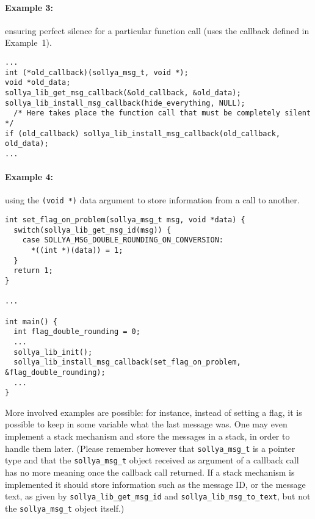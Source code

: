 \documentclass[a4paper]{article}
\begin{document}
\paragraph{Example 3:} ensuring perfect silence for a particular function call (uses the callback defined in Example~1).
\begin{center}
\begin{minipage}{15cm}\begin{Verbatim}[frame=single]
...
int (*old_callback)(sollya_msg_t, void *);
void *old_data;
sollya_lib_get_msg_callback(&old_callback, &old_data);
sollya_lib_install_msg_callback(hide_everything, NULL);
  /* Here takes place the function call that must be completely silent */
if (old_callback) sollya_lib_install_msg_callback(old_callback, old_data);
...
\end{Verbatim}
\end{minipage}\end{center}

\paragraph{Example 4:} using the \verb|(void *)| data argument to store information from a call to another.
\begin{center}
\begin{minipage}{15cm}\begin{Verbatim}[frame=single]
int set_flag_on_problem(sollya_msg_t msg, void *data) {
  switch(sollya_lib_get_msg_id(msg)) {
    case SOLLYA_MSG_DOUBLE_ROUNDING_ON_CONVERSION:
      *((int *)(data)) = 1;
  }
  return 1;
}

...

int main() {
  int flag_double_rounding = 0;
  ...
  sollya_lib_init();
  sollya_lib_install_msg_callback(set_flag_on_problem, &flag_double_rounding);
  ...
}
\end{Verbatim}
\end{minipage}\end{center}

More involved examples are possible: for instance, instead of setting a flag, it is possible to keep in some variable what the last message was. One may even implement a stack mechanism and store the messages in a stack, in order to handle them later. (Please remember however that \verb|sollya_msg_t| is a pointer type and that the \verb|sollya_msg_t| object received as argument of a callback call has no more meaning once the callback call returned. If a stack mechanism is implemented it should store information such as the message ID, or the message text, as given by \verb|sollya_lib_get_msg_id| and \verb|sollya_lib_msg_to_text|, but not the \verb|sollya_msg_t| object itself.)
\end{document}
